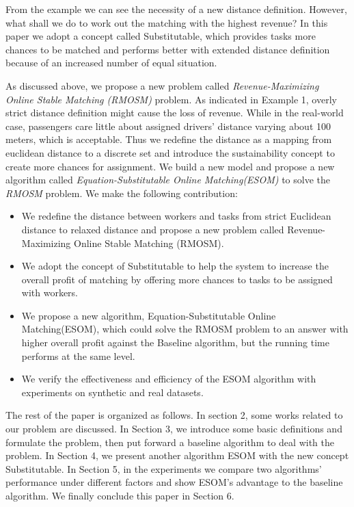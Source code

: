\documentclass[color,twoside,amssymb,twocolumn]{article}
\begin{document}
From the example we can see the necessity of a new distance definition. However, what shall we do to work out the matching with the highest revenue? In this paper we adopt a concept called Substitutable\cite{xia2017revenue}, which provides tasks more chances to be matched and performs better with extended distance definition because of an increased number of equal situation. %

As discussed above, we propose a new problem called {\it Revenue-Maximizing Online Stable Matching (RMOSM)} problem. As indicated in Example 1, overly strict distance definition might cause the loss of revenue. While in the real-world case, passengers care little about assigned drivers' distance varying about 100 meters, which is acceptable. 
Thus we redefine the distance as a mapping from euclidean distance to a discrete set and introduce the sustainability concept to create more chances for assignment. We build a new model and propose a new algorithm called {\it Equation-Substitutable Online Matching(ESOM)} to solve the {\it RMOSM} problem. We make the following contribution:
\begin{itemize}
	\item %
	{We redefine the distance between workers and tasks from strict Euclidean distance to relaxed distance and propose a new problem called Revenue-Maximizing Online Stable Matching (RMOSM).}
	\item We adopt the concept of  Substitutable\cite{xia2017revenue} to help the system to increase the overall profit of matching by offering more chances to tasks to be assigned with workers.
	\item We propose a new algorithm, Equation-Substitutable Online Matching(ESOM),  which could solve the RMOSM problem to an answer with higher overall profit against the Baseline algorithm, but the running time performs at the same level.
	\item %
	{We verify the effectiveness and efficiency of the ESOM algorithm with experiments on synthetic and real datasets.}
\end{itemize}
The rest of the paper is organized as follows. In section 2, some works related to our problem are discussed. In Section 3, we introduce some basic definitions and formulate the problem, then put forward a baseline algorithm to deal with the problem. In Section 4, we present another algorithm ESOM with the new concept Substitutable. In Section 5, in the experiments we compare two algorithms' performance under different factors and show ESOM's advantage to the baseline algorithm. We finally conclude this paper in Section 6.
\end{document}
